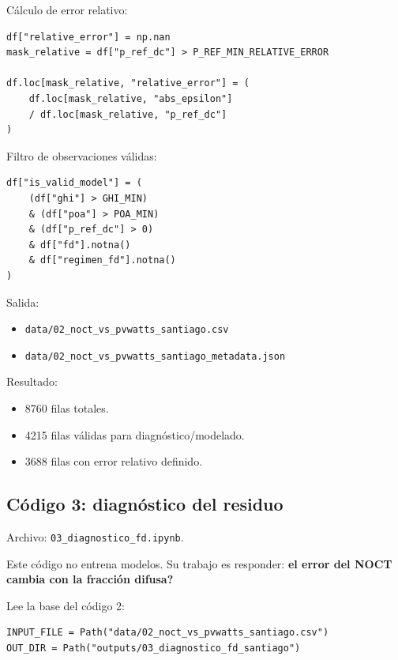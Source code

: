 \documentclass[11pt, letterpaper]{article}
\begin{document}
C\'alculo de error relativo:

\begin{lstlisting}[style=pythonstyle]
df["relative_error"] = np.nan
mask_relative = df["p_ref_dc"] > P_REF_MIN_RELATIVE_ERROR

df.loc[mask_relative, "relative_error"] = (
    df.loc[mask_relative, "abs_epsilon"]
    / df.loc[mask_relative, "p_ref_dc"]
)
\end{lstlisting}

Filtro de observaciones v\'alidas:

\begin{lstlisting}[style=pythonstyle]
df["is_valid_model"] = (
    (df["ghi"] > GHI_MIN)
    & (df["poa"] > POA_MIN)
    & (df["p_ref_dc"] > 0)
    & df["fd"].notna()
    & df["regimen_fd"].notna()
)
\end{lstlisting}

Salida:

\begin{itemize}
    \item \texttt{data/02\_noct\_vs\_pvwatts\_santiago.csv}
    \item \texttt{data/02\_noct\_vs\_pvwatts\_santiago\_metadata.json}
\end{itemize}

Resultado:

\begin{itemize}
    \item 8760 filas totales.
    \item 4215 filas v\'alidas para diagn\'ostico/modelado.
    \item 3688 filas con error relativo definido.
\end{itemize}

\subsection{C\'odigo 3: diagn\'ostico del residuo}

Archivo: \texttt{03\_diagnostico\_fd.ipynb}.

Este c\'odigo no entrena modelos. Su trabajo es responder: \textbf{\textquestiondown el error del NOCT cambia con la fracci\'on difusa?}

Lee la base del c\'odigo 2:

\begin{lstlisting}[style=pythonstyle]
INPUT_FILE = Path("data/02_noct_vs_pvwatts_santiago.csv")
OUT_DIR = Path("outputs/03_diagnostico_fd_santiago")
\end{lstlisting}
\end{document}
